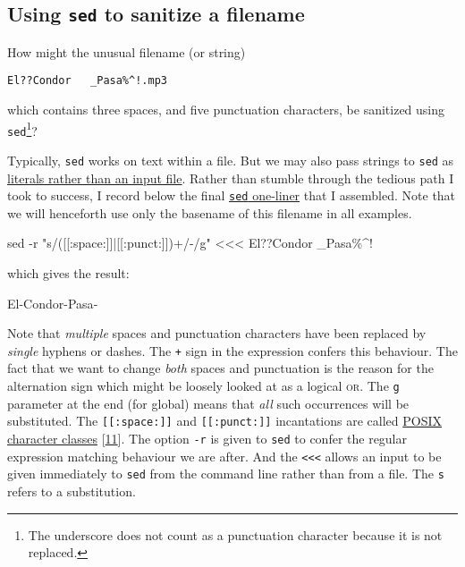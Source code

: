 \documentclass[
  a4paper,
]{article}
\newenvironment{Shaded}{\begin{snugshade}}{\end{snugshade}}
\newcommand{\AttributeTok}[1]{\textcolor[rgb]{0.80,0.80,0.80}{#1}}
\newcommand{\FunctionTok}[1]{\textcolor[rgb]{0.94,0.94,0.56}{#1}}
\newcommand{\NormalTok}[1]{\textcolor[rgb]{0.80,0.80,0.80}{#1}}
\newcommand{\OperatorTok}[1]{\textcolor[rgb]{0.94,0.94,0.82}{#1}}
\newcommand{\StringTok}[1]{\textcolor[rgb]{0.80,0.58,0.58}{#1}}
\begin{document}
\hypertarget{using-sed-to-sanitize-a-filename}{%
\subsection{\texorpdfstring{Using \texttt{sed} to sanitize a
filename}{Using sed to sanitize a filename}}\label{using-sed-to-sanitize-a-filename}}

How might the unusual filename (or string)

\texttt{El??Condor\ \ \ \_Pasa\%\^{}!.mp3}

which contains three spaces, and five punctuation characters, be
sanitized using \texttt{sed}\footnote{The underscore does not count as a
  punctuation character because it is not replaced.}?

Typically, \texttt{sed} works on text within a file. But we may also
pass strings to \texttt{sed} as
\href{https://www.baeldung.com/linux/sed-with-string}{literals rather
than an input file}. Rather than stumble through the tedious path I took
to success, I record below the final
\href{https://catonmat.net/sed-one-liners-explained-part-one}{\texttt{sed}
one-liner} that I assembled. Note that we will henceforth use only the
basename of this filename in all examples.

\begin{Shaded}
\begin{Highlighting}[]
\FunctionTok{sed} \AttributeTok{{-}r} \StringTok{"s/([[:space:]]|[[:punct:]])+/{-}/g"} \OperatorTok{\textless{}\textless{}\textless{}} \StringTok{\textquotesingle{}El??Condor   \_Pasa\%\^{}!\textquotesingle{}}
\end{Highlighting}
\end{Shaded}

which gives the result:

\begin{Shaded}
\begin{Highlighting}[]
\NormalTok{El{-}Condor{-}Pasa{-}}
\end{Highlighting}
\end{Shaded}

Note that \emph{multiple} spaces and punctuation characters have been
replaced by \emph{single} hyphens or dashes. The \texttt{+} sign in the
expression confers this behaviour. The fact that we want to change
\emph{both} spaces and punctuation is the reason for the
\texttt{\textbar{}} alternation sign which might be loosely looked at as
a logical \textsc{or}. The \texttt{g} parameter at the end (for global)
means that \emph{all} such occurrences will be substituted. The
\texttt{{[}{[}:space:{]}{]}} and \texttt{{[}{[}:punct:{]}{]}}
incantations are called
\href{https://www.regular-expressions.info/posixbrackets.html}{POSIX
character classes} {[}\protect\hyperlink{ref-posixcharclass}{11}{]}. The
option \texttt{-r} is given to \texttt{sed} to confer the regular
expression matching behaviour we are after. And the
\texttt{\textless{}\textless{}\textless{}} allows an input to be given
immediately to \texttt{sed} from the command line rather than from a
file. The \texttt{s} refers to a substitution.
\end{document}
